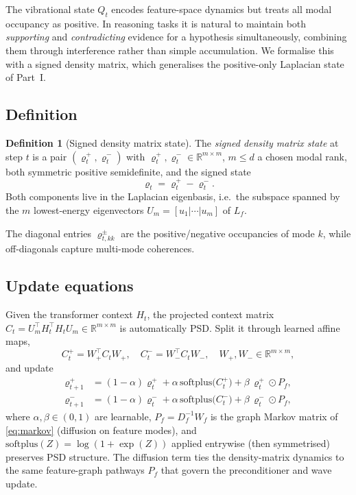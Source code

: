 \documentclass[12pt,a4paper]{article}
\theoremstyle{plain}
\theoremstyle{definition}
\newtheorem{definition}[theorem]{Definition}
\theoremstyle{remark}
\newcommand{\R}{\mathbb{R}}
\newcommand{\1}{\mathbf{1}}
\begin{document}
The vibrational state $Q_t$ encodes feature-space dynamics but treats all
modal occupancy as positive. In reasoning tasks it is natural to maintain
both \emph{supporting} and \emph{contradicting} evidence for a hypothesis
simultaneously, combining them through interference rather than simple
accumulation. We formalise this with a signed density matrix, which
generalises the positive-only Laplacian state of Part~I.

\subsection{Definition}

\begin{definition}[Signed density matrix state]
  The \emph{signed density matrix state} at step $t$ is a pair
  $(\varrho_t^{+}, \varrho_t^{-})$ with
  $\varrho_t^{+}, \varrho_t^{-} \in \R^{m \times m}$, $m \le d$ a chosen
  modal rank, both symmetric positive semidefinite, and the signed state
  \begin{equation}
    \varrho_t = \varrho_t^{+} - \varrho_t^{-}.
    \label{eq:signed_rho}
  \end{equation}
  Both components live in the Laplacian eigenbasis, i.e.\ the subspace
  spanned by the $m$ lowest-energy eigenvectors
  $U_m = [u_1|\cdots|u_m]$ of $L_f$.
\end{definition}

The diagonal entries $\varrho_{t,kk}^{\pm}$ are the positive/negative
occupancies of mode $k$, while off-diagonals capture multi-mode
coherences.

\subsection{Update equations}

Given the transformer context $H_t$, the projected context matrix
$C_t = U_m^\top H_t^\top H_t U_m \in \R^{m \times m}$ is automatically
PSD. Split it through learned affine maps,
\begin{equation}
  C_t^{+} = W_+^\top C_t W_+, \quad
  C_t^{-} = W_-^\top C_t W_-,
  \quad W_+, W_- \in \R^{m \times m},
  \label{eq:context_split}
\end{equation}
and update
\begin{align}
  \varrho_{t+1}^{+} &= (1-\alpha)\varrho_t^{+}
    + \alpha \, \mathrm{softplus}\bigl(C_t^{+}\bigr)
    + \beta \, \varrho_t^{+} \odot P_f,
    \label{eq:rho_plus} \\
  \varrho_{t+1}^{-} &= (1-\alpha)\varrho_t^{-}
    + \alpha \, \mathrm{softplus}\bigl(C_t^{-}\bigr)
    + \beta \, \varrho_t^{-} \odot P_f,
    \label{eq:rho_minus}
\end{align}
where $\alpha, \beta \in (0,1)$ are learnable, $P_f = D_f^{-1} W_f$ is the
graph Markov matrix of \eqref{eq:markov} (diffusion on feature modes),
and $\mathrm{softplus}(Z) = \log(1+\exp(Z))$ applied entrywise (then
symmetrised) preserves PSD structure. The diffusion term ties the
density-matrix dynamics to the same feature-graph pathways $P_f$ that
govern the preconditioner and wave update.
\end{document}
